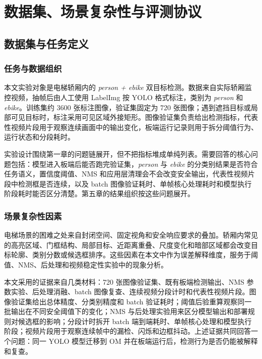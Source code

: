 \chapter{数据集、场景复杂性与评测协议}
\label{cha:data_protocol}

\section{数据集与任务定义}

\subsection{任务与数据组织}

本文实验对象是电梯轿厢内的 \textit{person + ebike} 双目标检测。数据来自实际轿厢监控视频，抽帧后由人工使用 LabelImg 按 YOLO 格式标注，类别为 \textit{person} 和 \textit{ebike}。训练集约 3600 张标注图像，验证集固定为 720 张图像；遇到遮挡目标或局部可见目标时，标注采用可见区域外接矩形。图像验证集负责给出检测指标，代表性视频片段用于观察连续画面中的输出变化，板端运行记录则用于拆分阈值行为、运行状态和分段耗时。

实验设计围绕第一章的问题链展开，但不把指标堆成单纯列表。需要回答的核心问题包括：模型进入板端后能否跑完验证集，\textit{person} 与 \textit{ebike} 的分类别结果是否符合任务语义，置信度阈值、NMS 和应用层清理会不会改变安全输出，代表性视频片段中检测框是否连续，以及 batch 图像验证耗时、单帧核心处理耗时和模型执行阶段耗时能否区分清楚。第五章的结果组织按这些问题展开。

\subsection{场景复杂性因素}

电梯场景的困难之处来自封闭空间、固定视角和安全响应要求的叠加。轿厢内常见的高亮区域、门框结构、局部目标、近距离重叠、尺度变化和暗部区域都会改变目标轮廓、类别分数或候选框排序。这些因素在本文中作为误差解释维度，服务于阈值、NMS、后处理和视频稳定性实验中的现象分析。

本文采用的证据来自几类材料：720 张图像验证集、既有板端检测输出、NMS 参数实验、后处理消融、batch 图像复查、连续视频分段计时和代表性视频片段。图像验证集给出总体精度、分类别精度和 batch 验证耗时；阈值后验重算观察同一批输出在不同安全阈值下的变化；NMS 与后处理实验用来区分模型输出和部署规则对候选框的影响；分段计时拆开 batch 端到端耗时、单帧核心处理和模型执行阶段；视频片段用于观察连续帧中的漏检、闪烁和边框抖动。上述证据共同回答一个问题：同一 YOLO 模型迁移到 OM 并在板端运行后，检测行为是否仍能被解释和复查。

